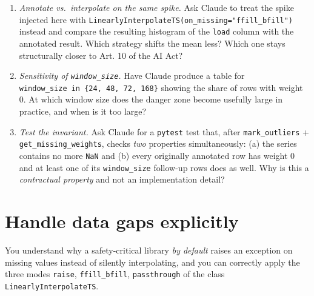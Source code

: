 \documentclass[
  english,
  letterpaper,
]{scrbook}
\providecommand{\tightlist}{%
  \setlength{\itemsep}{0pt}\setlength{\parskip}{0pt}}
\begin{document}
\begin{tcolorbox}[enhanced jigsaw, arc=.35mm, bottomrule=.15mm, bottomtitle=1mm, breakable, colback=white, colbacktitle=quarto-callout-tip-color!10!white, colframe=quarto-callout-tip-color-frame, coltitle=black, left=2mm, leftrule=.75mm, opacityback=0, opacitybacktitle=0.6, rightrule=.15mm, title=\textcolor{quarto-callout-tip-color}{\faLightbulb}\hspace{0.5em}{Exercises (with Claude)}, titlerule=0mm, toprule=.15mm, toptitle=1mm]

\begin{enumerate}
\def\labelenumi{\arabic{enumi}.}
\tightlist
\item
  \emph{Annotate vs.~interpolate on the same spike.} Ask Claude to treat
  the spike injected here with
  \texttt{LinearlyInterpolateTS(on\_missing="ffill\_bfill")} instead and
  compare the resulting histogram of the \texttt{load} column with the
  annotated result. Which strategy shifts the mean less? Which one stays
  structurally closer to Art. 10 of the AI Act?
\item
  \emph{Sensitivity of \texttt{window\_size}.} Have Claude produce a
  table for \texttt{window\_size\ in\ \{24,\ 48,\ 72,\ 168\}} showing
  the share of rows with weight 0. At which window size does the danger
  zone become usefully large in practice, and when is it too large?
\item
  \emph{Test the invariant.} Ask Claude for a \texttt{pytest} test that,
  after \texttt{mark\_outliers} + \texttt{get\_missing\_weights}, checks
  \emph{two} properties simultaneously: (a) the series contains no more
  \texttt{NaN} and (b) every originally annotated row has weight 0 and
  at least one of its \texttt{window\_size} follow-up rows does as well.
  Why is this a \emph{contractual property} and not an implementation
  detail?
\end{enumerate}

\end{tcolorbox}


\chapter{Handle data gaps explicitly}\label{sec-missing}

\begin{tcolorbox}[enhanced jigsaw, arc=.35mm, bottomrule=.15mm, bottomtitle=1mm, breakable, colback=white, colbacktitle=quarto-callout-note-color!10!white, colframe=quarto-callout-note-color-frame, coltitle=black, left=2mm, leftrule=.75mm, opacityback=0, opacitybacktitle=0.6, rightrule=.15mm, title=\textcolor{quarto-callout-note-color}{\faInfo}\hspace{0.5em}{Learning objective}, titlerule=0mm, toprule=.15mm, toptitle=1mm]

You understand why a safety-critical library \emph{by default} raises an
exception on missing values instead of silently interpolating, and you
can correctly apply the three modes \texttt{raise},
\texttt{ffill\_bfill}, \texttt{passthrough} of the class
\texttt{LinearlyInterpolateTS}.

\end{tcolorbox}
\end{document}
